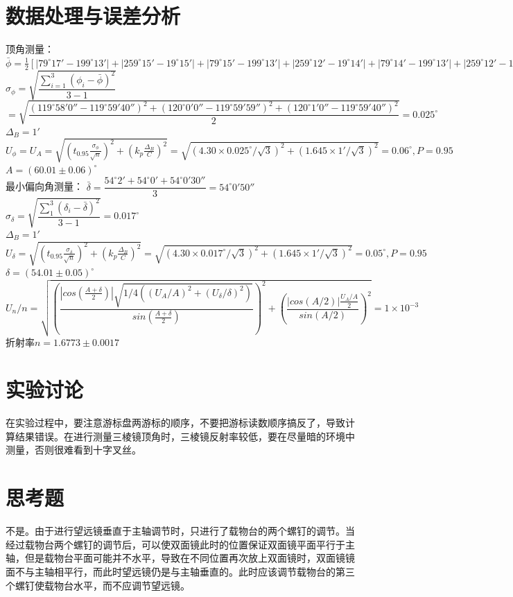 \documentclass{report}
\begin{document}
	\section{数据处理与误差分析}
	顶角测量：$\bar{\phi}=\frac{1}{2}[|79^{\circ}17'-199^{\circ}13'|+|259^{\circ}15'-19^{\circ}15'|+|79^{\circ}15'-199^{\circ}13'|+|259^{\circ}12'-19^{\circ}14'|+|79^{\circ}14'-199^{\circ}13'|+|259^{\circ}12'-19^{\circ}15'|]/3=119.994^{\circ}$\\
	$\sigma_{\phi}=\sqrt{\dfrac{\sum_{i=1}^{3}(\phi_i-\bar{\phi})^2}{3-1}}$ \\ $ =\sqrt{\dfrac{(119^{\circ}58'0''-119^{\circ}59'40'')^2+(120^{\circ}0'0''-119^{\circ}59'59'')^2+(120^{\circ}1'0''-119^{\circ}59'40'')^2}{2}}=0.025^{\circ}$
	\\
	$ \Delta_B=1' $\\
	$ U_{\phi}=U_{A}=\sqrt{(t_{0.95}\frac{\sigma_{\phi}}{\sqrt{n}})^2+(k_p\frac{\Delta_B}{C})^2}=\sqrt{(4.30\times0.025^{\circ}/\sqrt{3})^2+(1.645\times1'/\sqrt{3})^2}=0.06^{\circ},P=0.95 $\\
	$ A=(60.01\pm0.06)^{\circ} $\\
	最小偏向角测量：
	$ \bar{\delta}=\dfrac{54^{\circ}2'+54^{\circ}0'+54^{\circ}0'30''}{3}=54^{\circ}0'50'' $\\
	$ \sigma_{\delta}=\sqrt{\dfrac{\sum_{1}^{3}(\delta_i-\bar{\delta})^2}{3-1}}=0.017^{\circ} $\\
		$ \Delta_B=1' $\\
	$
	 U_{\delta}=\sqrt{(t_{0.95}\frac{\sigma_{\delta}}{\sqrt{n}})^2+(k_p\frac{\Delta_B}{C})^2}=\sqrt{(4.30\times0.017^{\circ}/\sqrt{3})^2+(1.645\times1'/\sqrt{3})^2}=0.05^{\circ},P=0.95 $\\
	$ \delta=(54.01\pm0.05)^{\circ} $\\
	$ U_n/n=\sqrt{(\dfrac{|cos(\frac{A+\delta}{2})|\sqrt{1/4((U_A/A)^2+(U_{\delta}/\delta)^2)}}{sin(\frac{A+\delta}{2})})^2+(\dfrac{|cos(A/2)|\frac{U_A/A}{2}}{sin(A/2)})^2}=1\times10^{-3} $\\
	折射率$ n=1.6773\pm0.0017 $
	
	
	
	
	\section{实验讨论}
在实验过程中，要注意游标盘两游标的顺序，不要把游标读数顺序搞反了，导致计算结果错误。在进行测量三棱镜顶角时，三棱镜反射率较低，要在尽量暗的环境中测量，否则很难看到十字叉丝。
	\section{思考题}
不是。由于进行望远镜垂直于主轴调节时，只进行了载物台的两个螺钉的调节。当经过载物台两个螺钉的调节后，可以使双面镜此时的位置保证双面镜平面平行于主轴，但是载物台平面可能并不水平，导致在不同位置再次放上双面镜时，双面镜镜面不与主轴相平行，而此时望远镜仍是与主轴垂直的。此时应该调节载物台的第三个螺钉使载物台水平，而不应调节望远镜。
	
\end{document}

